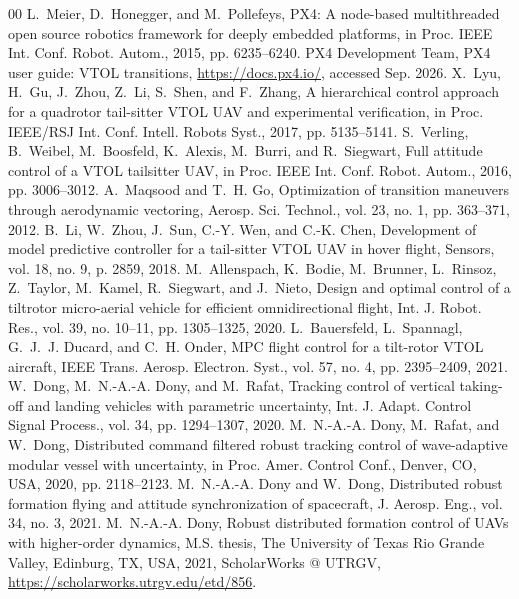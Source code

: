 \begin{thebibliography}{00}
 L.~Meier, D.~Honegger, and M.~Pollefeys, PX4: A node-based multithreaded open source robotics framework for deeply embedded platforms, in Proc. IEEE Int. Conf. Robot. Autom., 2015, pp. 6235--6240.
 PX4 Development Team, PX4 user guide: VTOL transitions, \url{https://docs.px4.io/}, accessed Sep. 2026.
 X.~Lyu, H.~Gu, J.~Zhou, Z.~Li, S.~Shen, and F.~Zhang, A hierarchical control approach for a quadrotor tail-sitter VTOL UAV and experimental verification, in Proc. IEEE/RSJ Int. Conf. Intell. Robots Syst., 2017, pp. 5135--5141.
 S.~Verling, B.~Weibel, M.~Boosfeld, K.~Alexis, M.~Burri, and R.~Siegwart, Full attitude control of a VTOL tailsitter UAV, in Proc. IEEE Int. Conf. Robot. Autom., 2016, pp. 3006--3012.
 A.~Maqsood and T.~H. Go, Optimization of transition maneuvers through aerodynamic vectoring, Aerosp. Sci. Technol., vol. 23, no. 1, pp. 363--371, 2012.
 B.~Li, W.~Zhou, J.~Sun, C.-Y. Wen, and C.-K. Chen, Development of model predictive controller for a tail-sitter VTOL UAV in hover flight, Sensors, vol. 18, no. 9, p. 2859, 2018.
 M.~Allenspach, K.~Bodie, M.~Brunner, L.~Rinsoz, Z.~Taylor, M.~Kamel, R.~Siegwart, and J.~Nieto, Design and optimal control of a tiltrotor micro-aerial vehicle for efficient omnidirectional flight, Int. J. Robot. Res., vol. 39, no. 10--11, pp. 1305--1325, 2020.
 L.~Bauersfeld, L.~Spannagl, G.~J.~J. Ducard, and C.~H. Onder, MPC flight control for a tilt-rotor VTOL aircraft, IEEE Trans. Aerosp. Electron. Syst., vol. 57, no. 4, pp. 2395--2409, 2021.
 W.~Dong, M.~N.-A.-A. Dony, and M.~Rafat, Tracking control of vertical taking-off and landing vehicles with parametric uncertainty, Int. J. Adapt. Control Signal Process., vol. 34, pp. 1294--1307, 2020.
 M.~N.-A.-A. Dony, M.~Rafat, and W.~Dong, Distributed command filtered robust tracking control of wave-adaptive modular vessel with uncertainty, in Proc. Amer. Control Conf., Denver, CO, USA, 2020, pp. 2118--2123.
 M.~N.-A.-A. Dony and W.~Dong, Distributed robust formation flying and attitude synchronization of spacecraft, J. Aerosp. Eng., vol. 34, no. 3, 2021.
 M.~N.-A.-A. Dony, Robust distributed formation control of UAVs with higher-order dynamics, M.S. thesis, The University of Texas Rio Grande Valley, Edinburg, TX, USA, 2021, ScholarWorks @ UTRGV, \url{https://scholarworks.utrgv.edu/etd/856}.

\end{thebibliography}
